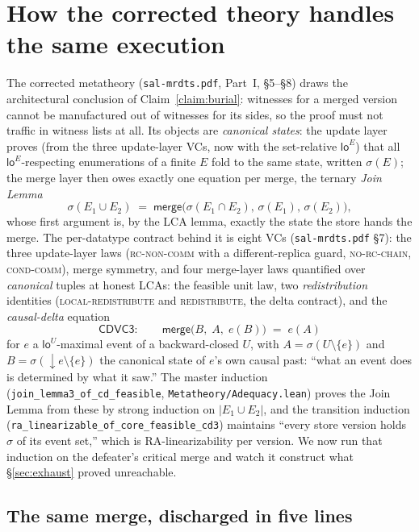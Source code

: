 \documentclass[11pt]{article}
\newcommand{\mergeL}{\mathsf{merge}}
\newcommand{\loE}[1]{\mathsf{lo}^{#1}}
\newcommand{\dow}[1]{{\downarrow}#1}
\newcommand{\cd}{\mathsf{CDVC3}}
\newcommand{\lean}[1]{\texttt{#1}}
\begin{document}
\section{How the corrected theory handles the same execution}
\label{sec:corrected}

The corrected metatheory (\texttt{sal-mrdts.pdf}, Part~I,
\S5--\S8) draws the architectural conclusion of
Claim~\ref{claim:burial}: witnesses for a merged version cannot be
manufactured out of witnesses for its sides, so the proof must not
traffic in witness lists at all. Its objects are \emph{canonical
states}: the update layer proves (from the three update-layer VCs,
now with the set-relative $\loE{E}$) that all $\loE{E}$-respecting
enumerations of a finite $E$ fold to the same state, written
$\sigma(E)$; the merge layer then owes exactly one equation per merge,
the ternary \emph{Join Lemma}
\[
  \sigma(E_1 \cup E_2) \;=\;
  \mergeL\bigl(\sigma(E_1 \cap E_2),\, \sigma(E_1),\, \sigma(E_2)\bigr),
\]
whose first argument is, by the LCA lemma, exactly the state the store
hands the merge. The per-datatype contract behind it is eight VCs
(\texttt{sal-mrdts.pdf} \S7): the three update-layer laws
(\textsc{rc-non-comm} with a different-replica guard,
\textsc{no-rc-chain}, \textsc{cond-comm}), merge symmetry, and four
merge-layer laws quantified over \emph{canonical} tuples at honest
LCAs: the feasible unit law, two \emph{redistribution} identities
(\textsc{local-redistribute} and \textsc{redistribute}, the delta
contract), and the \emph{causal-delta} equation
\[
  \cd: \qquad
  \mergeL\bigl(B,\; A,\; e(B)\bigr) \;=\; e(A)
\]
for $e$ a $\loE{U}$-maximal event of a backward-closed $U$, with
$A = \sigma(U \setminus \{e\})$ and
$B = \sigma(\dow{e} \setminus \{e\})$ the canonical state of $e$'s own
causal past: ``what an event does is determined by what it saw.'' The master
induction (\lean{join\_lemma3\_of\_cd\_feasible},
\lean{Metatheory/Adequacy.lean}) proves the Join Lemma from these by
strong induction on $|E_1 \cup E_2|$, and the transition induction
(\lean{ra\_linearizable\_of\_core\_feasible\_cd3}) maintains ``every
store version holds $\sigma$ of its event set,'' which is
RA-linearizability per version. We now run that induction on the
defeater's critical merge and watch it construct what
\S\ref{sec:exhaust} proved unreachable.

\subsection{The same merge, discharged in five lines}
\end{document}

